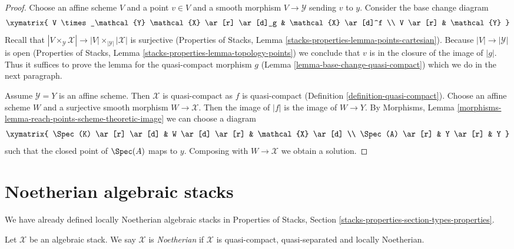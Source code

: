 \begin{proof}
Choose an affine scheme $V$ and a point $v \in V$ and a smooth morphism
$V \to \mathcal{Y}$ sending $v$ to $y$. Consider the base change diagram
$$
\xymatrix{
V \times_\mathcal{Y} \mathcal{X} \ar[r] \ar[d]_g & \mathcal{X} \ar[d]^f \\
V \ar[r] & \mathcal{Y}
}
$$
Recall that $|V \times_\mathcal{Y} \mathcal{X}| \to
|V| \times_{|\mathcal{Y}|} |\mathcal{X}|$ is surjective
(Properties of Stacks, Lemma \ref{stacks-properties-lemma-points-cartesian}).
Because $|V| \to |\mathcal{Y}|$ is open
(Properties of Stacks, Lemma \ref{stacks-properties-lemma-topology-points})
we conclude that $v$ is in the closure of the image of $|g|$.
Thus it suffices to prove the lemma for the quasi-compact morphism $g$
(Lemma \ref{lemma-base-change-quasi-compact}) which we do in the next
paragraph.

\medskip\noindent
Assume $\mathcal{Y} = Y$ is an affine scheme. Then $\mathcal{X}$
is quasi-compact as $f$ is quasi-compact
(Definition \ref{definition-quasi-compact}).
Choose an affine scheme $W$ and a surjective smooth morphism
$W \to \mathcal{X}$. Then the image of $|f|$ is the image
of $W \to Y$.
By Morphisms, Lemma \ref{morphisms-lemma-reach-points-scheme-theoretic-image}
we can choose a diagram
$$
\xymatrix{
\Spec(K) \ar[r] \ar[d] & W \ar[d] \ar[r] & \mathcal{X} \ar[d] \\
\Spec(A) \ar[r] & Y \ar[r] & Y
}
$$
such that the closed point of $\Spec(A)$ maps to $y$.
Composing with $W \to \mathcal{X}$ we obtain a solution.
\end{proof}











\section{Noetherian algebraic stacks}
\label{section-noetherian}

\noindent
We have already defined locally Noetherian algebraic stacks in
Properties of Stacks, Section \ref{stacks-properties-section-types-properties}.

\begin{definition}
\label{definition-noetherian}
Let $\mathcal{X}$ be an algebraic stack. We say $\mathcal{X}$ is
{\it Noetherian} if $\mathcal{X}$ is quasi-compact, quasi-separated
and locally Noetherian.
\end{definition}

